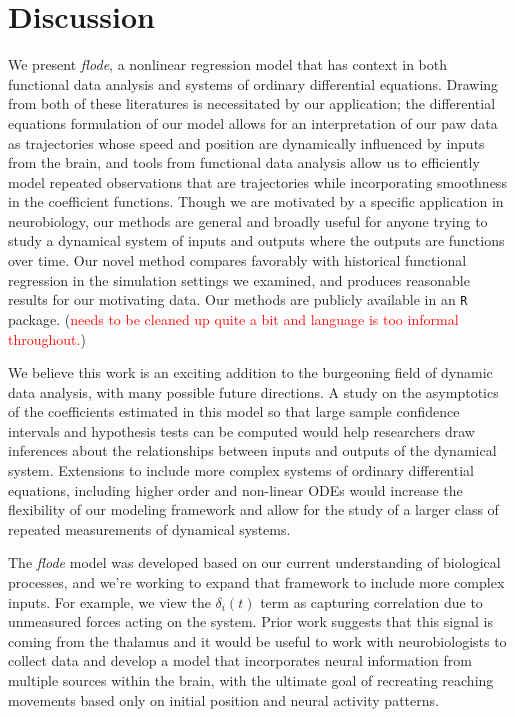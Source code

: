 \documentclass[preprint]{JASA}
\begin{document}
\hypertarget{discussion}{%
\section{Discussion}\label{discussion}}

\label{sec:discussion}

We present \emph{flode}, a nonlinear regression model that has context
in both functional data analysis and systems of ordinary differential
equations. Drawing from both of these literatures is necessitated by our
application; the differential equations formulation of our model allows
for an interpretation of our paw data as trajectories whose speed and
position are dynamically influenced by inputs from the brain, and tools
from functional data analysis allow us to efficiently model repeated
observations that are trajectories while incorporating smoothness in the
coefficient functions. Though we are motivated by a specific application
in neurobiology, our methods are general and broadly useful for anyone
trying to study a dynamical system of inputs and outputs where the
outputs are functions over time. Our novel method compares favorably
with historical functional regression in the simulation settings we
examined, and produces reasonable results for our motivating data. Our
methods are publicly available in an \texttt{R} package.
(\textcolor{red}{needs to be cleaned up quite a bit and language is too informal throughout.})

We believe this work is an exciting addition to the burgeoning field of
dynamic data analysis, with many possible future directions. A study on
the asymptotics of the coefficients estimated in this model so that
large sample confidence intervals and hypothesis tests can be computed
would help researchers draw inferences about the relationships between
inputs and outputs of the dynamical system. Extensions to include more
complex systems of ordinary differential equations, including higher
order and non-linear ODEs would increase the flexibility of our modeling
framework and allow for the study of a larger class of repeated
measurements of dynamical systems.

The \emph{flode} model was developed based on our current understanding
of biological processes, and we're working to expand that framework to
include more complex inputs. For example, we view the \(\delta_i(t)\)
term as capturing correlation due to unmeasured forces acting on the
system. Prior work suggests that this signal is coming from the thalamus
and it would be useful to work with neurobiologists to collect data and
develop a model that incorporates neural information from multiple
sources within the brain, with the ultimate goal of recreating reaching
movements based only on initial position and neural activity patterns.
\end{document}
